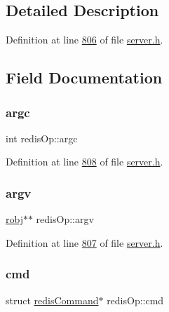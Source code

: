 \subsection{Detailed Description}


Definition at line \hyperlink{server_8h_source_l00806}{806} of file \hyperlink{server_8h_source}{server.\+h}.



\subsection{Field Documentation}
\mbox{\label{structredisOp_a3c09f5951da716ea4c4cb37603dacdf3}} 
\subsubsection{\texorpdfstring{argc}{argc}}
{\footnotesize\ttfamily int redis\+Op\+::argc}



Definition at line \hyperlink{server_8h_source_l00808}{808} of file \hyperlink{server_8h_source}{server.\+h}.

\mbox{\label{structredisOp_acf3641396d2a361fe312b575f4ab9e85}} 
\subsubsection{\texorpdfstring{argv}{argv}}
{\footnotesize\ttfamily \hyperlink{structredisObject}{robj}$\ast$$\ast$ redis\+Op\+::argv}



Definition at line \hyperlink{server_8h_source_l00807}{807} of file \hyperlink{server_8h_source}{server.\+h}.

\mbox{\label{structredisOp_a7e9958bc58002330df5acccbaba0dfa3}} 
\subsubsection{\texorpdfstring{cmd}{cmd}}
{\footnotesize\ttfamily struct \hyperlink{structredisCommand}{redis\+Command}$\ast$ redis\+Op\+::cmd}



